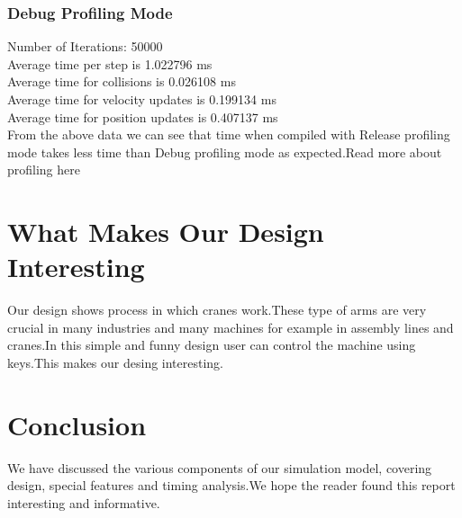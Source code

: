 \documentclass[11pt]{article}
\begin{document}
\subsubsection{Debug Profiling Mode}
Number of Iterations: 50000 \\
Average time per step is 1.022796 ms \\ 
Average time for collisions is 0.026108 ms \\
Average time for velocity updates is 0.199134 ms \\
Average time for position updates is 0.407137 ms\\

From the above data we can see that time when compiled with Release profiling mode takes less time than Debug profiling mode as expected.Read more about profiling here
\cite{prof}\
\section{What Makes Our Design Interesting}
Our design shows process in which cranes work.These type of arms are very crucial in many industries and many machines for example in assembly lines and cranes.In this simple and funny design user can control the machine using keys.This makes our desing interesting.
\section{Conclusion}
We have discussed the various components of our simulation model, covering design, special features and timing analysis.We hope the reader found this report interesting and informative.


\end{document}
